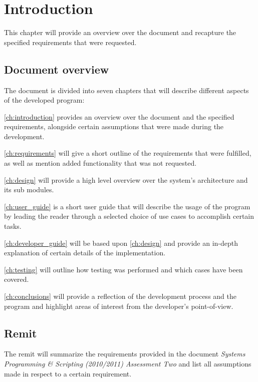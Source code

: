 \chapter{Introduction}\label{ch:introduction}

This chapter will provide an overview over the document and recapture the specified requirements that were requested.

\section{Document overview}
\label{sec:document_overview}

The document is divided into seven chapters that will describe different aspects of the developed program:

\autoref{ch:introduction} provides an overview over the document and the specified requirements, alongside certain assumptions that were made during the development.

\autoref{ch:requirements} will give a short outline of the requirements that were fulfilled, as well as mention added functionality that was not requested.

\autoref{ch:design} will provide a high level overview over the system's architecture and its sub modules.

\autoref{ch:user_guide} is a short user guide that will describe the usage of the program by leading the reader through a selected choice of use cases to accomplish certain tasks.

\autoref{ch:developer_guide} will be based upon \autoref{ch:design} and provide an in-depth explanation of certain details of the implementation.

\autoref{ch:testing} will outline how testing was performed and which cases have been covered.

\autoref{ch:conclusions} will provide a reflection of the development process and the program and highlight areas of interest from the developer's point-of-view.

\section{Remit}
\label{sec:remit}

The remit will summarize the requirements provided in the document \textit{Systems Programming \& Scripting (2010/2011) Assessment Two} and list all assumptions made in respect to a certain requirement.

